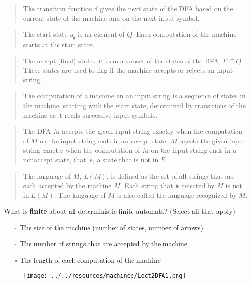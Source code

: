 \documentclass[12pt, oneside]{article}
\begin{document}
\begin{quote}
The transition function $\delta$ gives the next state of the DFA based on the current state of 
the machine and on the next input symbol.
\end{quote}

\begin{quote}
The start state $q_0$ is an element of $Q$.  Each computation of the machine starts at the  start  state.
\end{quote}

\begin{quote}
The accept (final) states $F$ form a subset of the states of the DFA, $F \subseteq  Q$. 
These states are used to flag if the machine accepts or rejects an input string.
\end{quote}


\begin{quote}
The computation of a machine on an input string is a sequence of states
in the machine,  starting with the start state, determined by transitions 
of the machine as it reads successive input symbols.
\end{quote}

\begin{quote}
The DFA $M$ accepts the given input string exactly when the computation of $M$ on the input string
ends in an accept state. $M$ rejects the given input string exactly when the computation of 
$M$ on the input string ends in a nonaccept state, that is, a state that is not in $F$.
\end{quote}

\begin{quote} 
The language of $M$, $L(M)$, is defined as the set of  all strings that are each accepted 
by the machine $M$. Each string that is rejected by $M$ is not in $L(M)$.
The language of $M$ is also called the language recognized by $M$.
\end{quote}   
   
What is {\bf finite} about all deterministic finite automata? (Select all that apply)
\begin{itemize}
   \item[$\square$] The size of the machine (number of states, number of arrows)
   \item[$\square$] The number of strings that are accepted by the machine
   \item[$\square$] The length of each computation of the machine
\end{itemize}
  
\begin{figure}[h]
   \centering
   \texttt{[image: ../../resources/machines/Lect2DFA1.png]} 
\end{figure}
   
\end{document}
